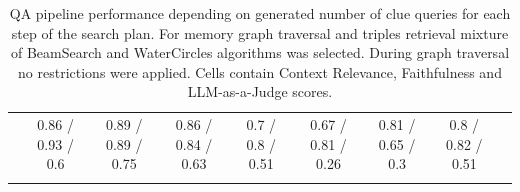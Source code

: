 \begin{table}[th!]
{\begin{tabular}{|cc|c|c|c|c|c|c||c|}
    \hhline{|========::=}
    \multicolumn{2}{|c|}{Mean} & 0.86 / 0.93 / 0.6 & 0.89 / 0.89 / 0.75 & 0.86 / 0.84 / 0.63 & 0.7 / 0.8 / 0.51 & 0.67 / 0.81 / 0.26 & 0.81 / 0.65 / 0.3 & 0.8 / 0.82 / 0.51 \\ 
    \hhline{|--|-|-|-|-|-|-||-|}
    \end{tabular}}
    \renewcommand{\arraystretch}{1}
    \caption{QA pipeline performance depending on generated number of clue queries for each step of the search plan. For memory graph traversal and triples retrieval mixture of BeamSearch and WaterCircles algorithms was selected. During graph traversal no restrictions were applied. Cells contain Context Relevance, Faithfulness and LLM-as-a-Judge scores.}
	\label{tab:bsws_all_maxcluequeries_ablation}
\end{table}

